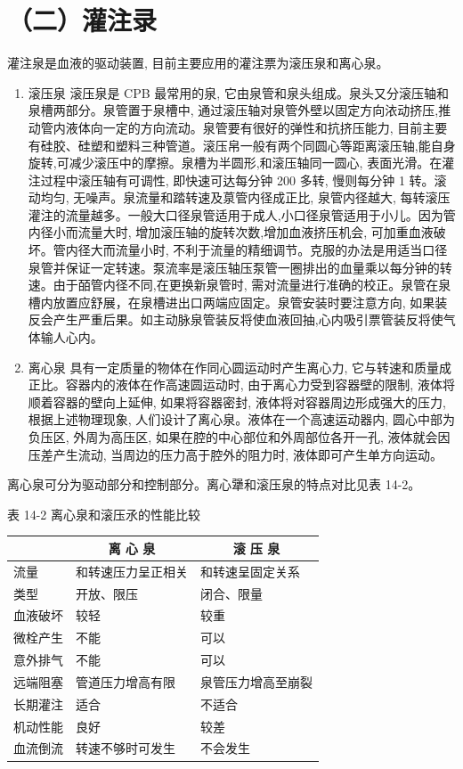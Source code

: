 \documentclass[10pt]{article}
\begin{document}
\section*{（二）灌注录}
灌注泉是血液的驱动装置, 目前主要应用的灌注票为滚压泉和离心泉。

\begin{enumerate}
  \item 滚压泉 滚压泉是 CPB 最常用的泉, 它由泉管和泉头组成。泉头又分滚压轴和泉槽两部分。泉管置于泉槽中, 通过滚压轴对泉管外壁以固定方向㳖动挤压,推动管内液体向一定的方向流动。泉管要有很好的弹性和抗挤压能力, 目前主要有硅胶、硅塑和塑料三种管道。滚压帛一般有两个同圆心等距离滚压轴,能自身旋转,可减少滚压中的摩擦。泉槽为半圆形,和滚压轴同一圆心, 表面光滑。在灌注过程中滚压轴有可调性, 即快速可达每分钟 200 多转, 慢则每分钟 1 转。滚动均匀, 无噪声。泉流量和踏转速及葲管内径成正比, 泉管内径越大, 每转滚压灌注的流量越多。一般大口径泉管适用于成人,小口径泉管适用于小儿。因为管内径小而流量大时, 增加滚压轴的旋转次数,增加血液挤压机会, 可加重血液破坏。管内径大而流量小时, 不利于流量的精细调节。克服的办法是用适当口径泉管并保证一定转速。泵流率是滚压轴压泵管一圈排出的血量乘以每分钟的转速。由于皕管内径不同,在更换新泉管时, 需对流量进行准确的校正。泉管在泉槽内放置应舒展，在泉槽进出口两端应固定。泉管安装时要注意方向, 如果装反会产生严重后果。如主动脉泉管装反将使血液回抽,心内吸引票管装反将使气体输人心内。

  \item 离心泉 具有一定质量的物体在作同心圆运动时产生离心力, 它与转速和质量成正比。容器内的液体在作高速圆运动时, 由于离心力受到容器壁的限制, 液体将顺着容器的壁向上延伸, 如果将容器密封, 液体将对容器周边形成强大的压力, 根据上述物理现象, 人们设计了离心泉。液体在一个高速运动器内, 圆心中部为负压区, 外周为高压区, 如果在腔的中心部位和外周部位各开一孔, 液体就会因压差产生流动, 当周边的压力高于腔外的阻力时, 液体即可产生单方向运动。

\end{enumerate}

离心泉可分为驱动部分和控制部分。离心犟和滚压泉的特点对比见表 14-2。

表 14-2 离心泉和滚压氶的性能比较

\begin{center}
\begin{tabular}{lll}
\hline
 & \multicolumn{1}{c}{离 心 泉} & \multicolumn{1}{c}{滚 压 泉} \\
\hline
流量 & 和转速压力呈正相关 & 和转速呈固定关系 \\
类型 & 开放、限压 & 闭合、限量 \\
血液破坏 & 较轻 & 较重 \\
微栓产生 & 不能 & 可以 \\
意外排气 & 不能 & 可以 \\
远端阻塞 & 管道压力增高有限 & 泉管压力增高至崩裂 \\
长期灌注 & 适合 & 不适合 \\
机动性能 & 良好 & 较差 \\
血流倒流 & 转速不够时可发生 & 不会发生 \\
\hline
\end{tabular}
\end{center}
\end{document}

